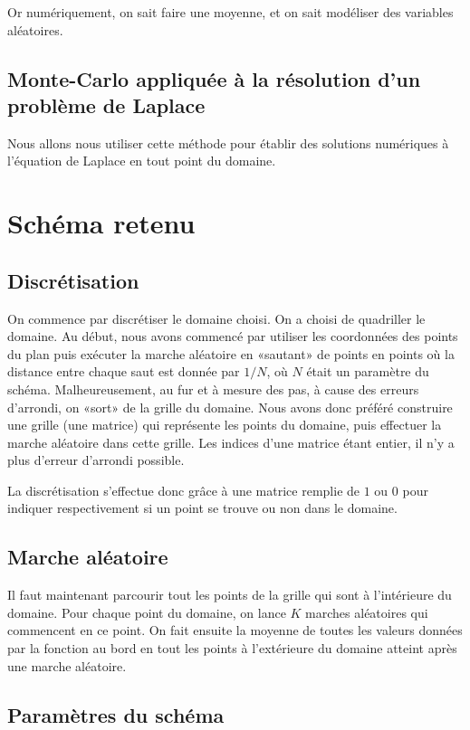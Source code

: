 \documentclass[11pt, a4paper]{article}
\begin{document}
Or numériquement, on sait faire une moyenne, et on sait modéliser des variables aléatoires.



\subsection{Monte-Carlo appliquée à la résolution d'un problème de Laplace}

Nous allons nous utiliser cette méthode pour établir des solutions numériques à l'équation de Laplace en tout point du domaine.


\section{Schéma retenu}

\subsection{Discrétisation}
On commence par discrétiser le domaine choisi. On a choisi de quadriller le domaine.  Au début, nous
avons commencé par utiliser les coordonnées des points du plan puis exécuter la marche aléatoire en
«sautant» de points en points où la distance entre chaque saut est donnée par $1/N$, où $N$ était un
paramètre du schéma.  Malheureusement, au fur et à mesure des pas, à cause des erreurs d'arrondi, on
«sort» de la grille du domaine. Nous avons donc préféré construire une grille (une matrice) qui
représente les points du domaine, puis effectuer la marche aléatoire dans cette grille. Les indices
d'une matrice étant entier, il n'y a plus d'erreur d'arrondi possible.

La discrétisation s'effectue donc grâce à une matrice remplie de $1$ ou $0$ pour indiquer
respectivement si un point se trouve ou non dans le domaine.

\subsection{Marche aléatoire}

Il faut maintenant parcourir tout les points de la grille qui sont à l'intérieure du domaine.
Pour chaque point du domaine, on lance $K$  marches aléatoires qui commencent en ce point. On fait
ensuite la moyenne de toutes les valeurs données par la fonction au bord en tout les points à
l'extérieure du domaine atteint après une marche aléatoire.


\subsection{Paramètres du schéma}
\end{document}
